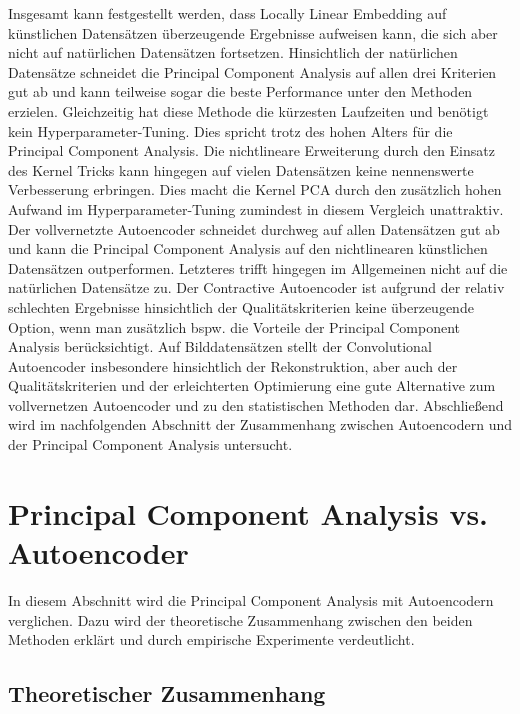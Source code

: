 Insgesamt kann festgestellt werden, dass Locally Linear Embedding auf künstlichen Datensätzen
überzeugende Ergebnisse aufweisen kann, die sich aber nicht auf natürlichen Datensätzen fortsetzen.
Hinsichtlich der natürlichen Datensätze schneidet die Principal Component Analysis auf allen drei
Kriterien gut ab und kann teilweise sogar die beste Performance unter den Methoden erzielen.
Gleichzeitig hat diese Methode die kürzesten Laufzeiten und benötigt kein Hyperparameter-Tuning.
Dies spricht trotz des hohen Alters für die Principal Component Analysis. Die nichtlineare
Erweiterung durch den Einsatz des Kernel Tricks kann hingegen auf vielen Datensätzen keine
nennenswerte Verbesserung erbringen. Dies macht die Kernel PCA durch den zusätzlich hohen Aufwand
im Hyperparameter-Tuning zumindest in diesem Vergleich unattraktiv. Der vollvernetzte Autoencoder
schneidet durchweg auf allen Datensätzen gut ab und kann die Principal Component Analysis auf den
nichtlinearen künstlichen Datensätzen outperformen. Letzteres trifft hingegen im Allgemeinen nicht
auf die natürlichen Datensätze zu. Der Contractive Autoencoder ist aufgrund der relativ schlechten
Ergebnisse hinsichtlich der Qualitätskriterien keine überzeugende Option, wenn man zusätzlich bspw.
die Vorteile der Principal Component Analysis berücksichtigt. Auf Bilddatensätzen stellt der
Convolutional Autoencoder insbesondere hinsichtlich der Rekonstruktion, aber auch der
Qualitätskriterien und der erleichterten Optimierung eine gute Alternative zum vollvernetzen
Autoencoder und zu den statistischen Methoden dar. Abschließend wird im nachfolgenden Abschnitt der
Zusammenhang zwischen Autoencodern und der Principal Component Analysis untersucht.

\section{Principal Component Analysis vs. Autoencoder}
\label{ch:Vergleich:sec:Resultate:PCA_AE}

In diesem Abschnitt wird die Principal Component Analysis mit Autoencodern verglichen. Dazu wird
der theoretische Zusammenhang zwischen den beiden Methoden erklärt und durch empirische Experimente
verdeutlicht.

\subsection{Theoretischer Zusammenhang}

